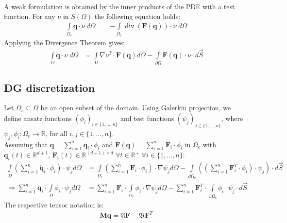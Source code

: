 \documentclass{IOS-Book-Article}
\theoremstyle{plain}
\theoremstyle{definition}
\DeclareMathOperator{\diverg}{div}
\begin{document}
A weak formulation is obtained by the inner products of the PDE with a test function. For any $\nu$ in $S(\Omega)$ the following equation holds:
\begin{align}
	\int \limits_{\Omega_e} \dot{\mathbf q} \cdot \nu \; d\Omega &= - \int \limits_{\Omega_e} \diverg (\mathbf F(\mathbf q)) \cdot \nu \; d\Omega
\end{align}
Applying the Divergence Theorem gives:
\begin{align}
	\int \limits_{\Omega} \dot{\mathbf q} \cdot \nu \; d\Omega &= \int \limits_{\Omega} \nabla \nu^T \cdot \mathbf F(\mathbf q) d\Omega - \int \limits_{\partial \Omega} \mathbf F(\mathbf q) \cdot \nu \cdot d \vec{S}
	\label{eqn:swe_weak_form}
\end{align}

\subsection{DG discretization}

Let $\Omega_e \subseteq \Omega$ be an open subset of the domain. Using Galerkin projection, we define ansatz functions $(\phi_i)_{i \in \{1, \dots , n\}}$ and test functions $(\psi_j)_{j \in \{1, \dots , n\}}$, where $\psi_j, \phi_i : \Omega_e \rightarrow \mathbb{R}$, for all $i,j \in \{1, \dots , n\}$.\\
Assuming that $\mathbf q = \sum \limits_{i = 1}^{n} \mathbf q_i \cdot \phi_i$ and $\mathbf F(\mathbf q) = \sum \limits_{i = 1}^{n} \mathbf F_i \cdot \phi_i$ in  $\Omega_e$ with $\mathbf q_i(t) \in \mathbb{R}^{d + 1}$, $\mathbf F_i(t) \in \mathbb R^{(d+1) \times d}$ $\forall t \in \mathbb{R}^{+}$ $\forall i \in \{1, \dots , n\}$:
\begin{align}
	\int \limits_{\Omega} (\sum \limits_{i = 1}^{n} \dot{\mathbf q}_i \cdot \phi_i) \cdot \psi_j d\Omega &= \int \limits_{\Omega_e} (\sum \limits_{i = 1}^{n} \mathbf F_i \cdot \phi_i) \cdot \nabla \psi_j d\Omega - \int \limits_{\partial \Omega_e} ((\sum \limits_{i = 1}^{n} \mathbf F^T_i \cdot \phi_i) \cdot \psi_j) \cdot d \vec{S}\\
	\Rightarrow \sum \limits_{i = 1}^{n} \dot{\mathbf q}_i \cdot \int \limits_{\Omega} \phi_i \cdot \psi_j d\Omega &= \sum \limits_{i = 1}^{n} \mathbf F_i \cdot \int \limits_{\Omega_e} \phi_i \cdot \nabla \psi_j d\Omega - \sum \limits_{i = 1}^{n} \mathbf F^T_i \cdot \int \limits_{\partial \Omega_e} \phi_i \cdot \psi_j \cdot d \vec{S}
\end{align}
The respective tensor notation is:
\begin{align}
	\mathbf M \mathbf{\dot q} = \mathfrak A \mathbf{F} - \mathfrak B \mathbf{F}^T
	\label{eqn:heq_fem_matrix_form}
\end{align}
\end{document}
